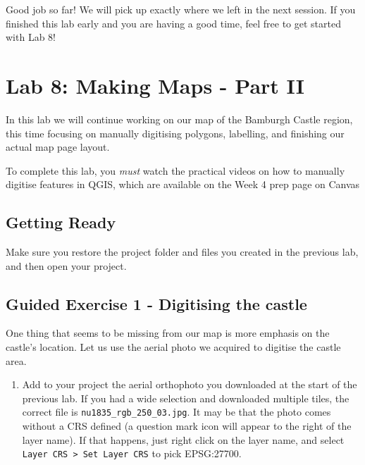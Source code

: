 \documentclass[
  letterpaper,
  DIV=11,
  numbers=noendperiod]{scrreprt}
\providecommand{\tightlist}{%
  \setlength{\itemsep}{0pt}\setlength{\parskip}{0pt}}\usepackage{longtable,booktabs,array}
\begin{document}
Good job so far! We will pick up exactly where we left in the next
session. If you finished this lab early and you are having a good time,
feel free to get started with Lab 8!

\chapter{Lab 8: Making Maps - Part II}\label{sec-carto2}

In this lab we will continue working on our map of the Bamburgh Castle
region, this time focusing on manually digitising polygons, labelling,
and finishing our actual map page layout.

\begin{tcolorbox}[enhanced jigsaw, breakable, toptitle=1mm, colback=white, left=2mm, leftrule=.75mm, titlerule=0mm, colframe=quarto-callout-warning-color-frame, opacityback=0, title=\textcolor{quarto-callout-warning-color}{\faExclamationTriangle}\hspace{0.5em}{Warning}, toprule=.15mm, opacitybacktitle=0.6, bottomtitle=1mm, colbacktitle=quarto-callout-warning-color!10!white, bottomrule=.15mm, coltitle=black, rightrule=.15mm, arc=.35mm]

To complete this lab, you \emph{must} watch the practical videos on how
to manually digitise features in QGIS, which are available on the Week 4
prep page on Canvas

\end{tcolorbox}

\section{Getting Ready}\label{getting-ready}

Make sure you restore the project folder and files you created in the
previous lab, and then open your project.

\section{Guided Exercise 1 - Digitising the
castle}\label{guided-exercise-1---digitising-the-castle}

One thing that seems to be missing from our map is more emphasis on the
castle's location. Let us use the aerial photo we acquired to digitise
the castle area.

\begin{enumerate}
\def\labelenumi{(\arabic{enumi})}
\setcounter{enumi}{226}
\tightlist
\item
  Add to your project the aerial orthophoto you downloaded at the start
  of the previous lab. If you had a wide selection and downloaded
  multiple tiles, the correct file is \texttt{nu1835\_rgb\_250\_03.jpg}.
  It may be that the photo comes without a CRS defined (a question mark
  icon will appear to the right of the layer name). If that happens,
  just right click on the layer name, and select
  \texttt{Layer\ CRS\ \textgreater{}\ Set\ Layer\ CRS} to pick
  EPSG:27700.
\end{enumerate}
\end{document}
